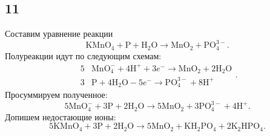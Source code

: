 \subsection{11}

Составим уравнение реакции
\[
\mathrm{KMnO_4}+\mathrm{P}+\mathrm{H_2O}\longrightarrow\mathrm{MnO_2}+\mathrm{PO_4^{3-}}.
\]
Полуреакции идут по следующим схемам:
\[
\begin{array}{r|l}
	5 & \mathrm{MnO_4^-}+4\mathrm{H^+}+3e^-\longrightarrow\mathrm{MnO_2}+2\mathrm{H_2O} \\
	3 & \mathrm{P}+4\mathrm{H_2O}-5e^-\longrightarrow\mathrm{PO_4^{3-}}+8\mathrm{H^+}
\end{array}.
\]
Просуммируем полученное:
\[
5\mathrm{MnO_4^-}+3\mathrm{P}+2\mathrm{H_2O}\longrightarrow5\mathrm{MnO_2}+3\mathrm{PO_4^{3-}}+4\mathrm{H^+}.
\]
Допишем недостающие ионы:
\[
5\mathrm{KMnO_4}+3\mathrm{P}+2\mathrm{H_2O}\longrightarrow5\mathrm{MnO_2}+\mathrm{KH_2PO_4}+2\mathrm{K_2HPO_4}.
\]